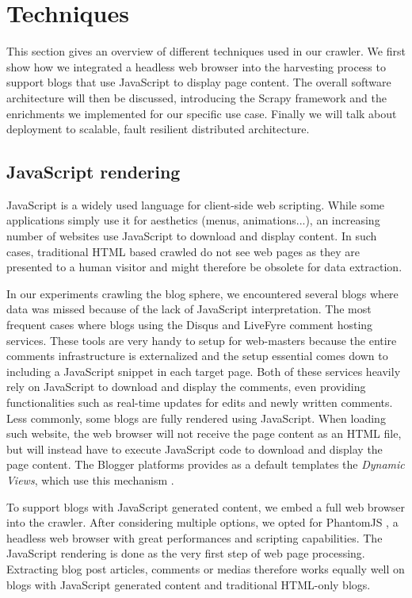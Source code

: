\section{Techniques}

This section gives an overview of different techniques used in our crawler. We first show how we integrated a headless web browser into the harvesting process to support blogs that use JavaScript to display page content. The overall software architecture will then be discussed, introducing the Scrapy framework and the enrichments we implemented for our specific use case. Finally we will talk about deployment to scalable, fault resilient distributed architecture.


\subsection{JavaScript rendering}
JavaScript is a widely used language for client-side web scripting. While some applications simply use it for aesthetics (menus, animations...), an increasing number of websites use JavaScript to download and display content. In such cases, traditional HTML based crawled do not see web pages as they are presented to a human visitor and might therefore be obsolete for data extraction.

In our experiments crawling the blog sphere, we encountered several blogs where data was missed because of the lack of JavaScript interpretation. The most frequent cases where blogs using the Disqus \cite{disqus2013} and LiveFyre \cite{livefyre2013} comment hosting services. These tools are very handy to setup for web-masters because the entire comments infrastructure is externalized and the setup essential comes down to including a JavaScript snippet in each target page. Both of these services heavily rely on JavaScript to download and display the comments, even providing functionalities such as real-time updates for edits and newly written comments. Less commonly, some blogs are fully rendered using JavaScript. When loading such website, the web browser will not receive the page content as an HTML file, but will instead have to execute JavaScript code to download and display the page content. The Blogger platforms provides as a default templates the \emph{Dynamic Views}, which use this mechanism \cite{antinharasymiv2011}.

To support blogs with JavaScript generated content, we embed a full web browser into the crawler. After considering multiple options, we opted for PhantomJS \cite{phantomjs2013}, a headless web browser with great performances and scripting capabilities. The JavaScript rendering is done as the very first step of web page processing. Extracting blog post articles, comments or medias therefore works equally well on blogs with JavaScript generated content and traditional HTML-only blogs.

